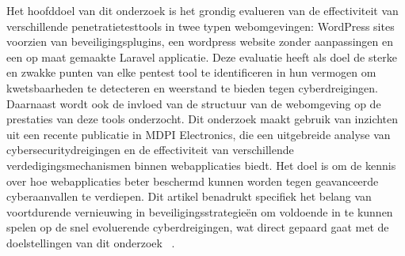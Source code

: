 Het hoofddoel van dit onderzoek is het grondig evalueren van de effectiviteit van verschillende penetratietesttools in twee typen webomgevingen: 
WordPress sites voorzien van beveiligingsplugins, een wordpress website zonder aanpassingen en een op maat gemaakte Laravel applicatie. Deze evaluatie 
heeft als doel de sterke en zwakke punten van elke pentest tool te identificeren in hun vermogen om kwetsbaarheden te detecteren en weerstand te bieden 
tegen cyberdreigingen. Daarnaast wordt ook de invloed van de structuur van de webomgeving op de prestaties van deze tools onderzocht.
Dit onderzoek maakt gebruik van inzichten uit een recente publicatie in MDPI Electronics, die een uitgebreide analyse van cybersecuritydreigingen en 
de effectiviteit van verschillende verdedigingsmechanismen binnen webapplicaties biedt. Het doel is om de kennis over hoe webapplicaties beter 
beschermd kunnen worden tegen geavanceerde cyberaanvallen te verdiepen. Dit artikel benadrukt specifiek het belang van voortdurende vernieuwing 
in beveiligingsstrategieën om voldoende in te kunnen spelen op de snel evoluerende cyberdreigingen, wat direct gepaard gaat met de doelstellingen van dit 
onderzoek ~\autocite{Altulaihan2023}.




